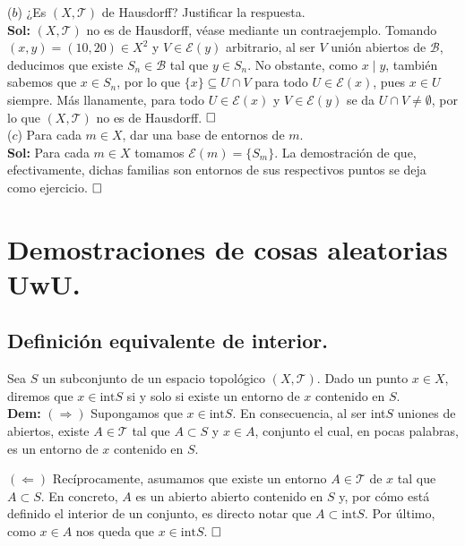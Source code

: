 \documentclass{article}
\begin{document}
\noindent($b$) ¿Es $(X, \mathcal{T})$ de Hausdorff? Justificar la respuesta. \\

\noindent\textbf{Sol:} $(X, \mathcal{T})$ no es de Hausdorff, véase mediante un contraejemplo. Tomando $(x, y) = (10, 20) \in X^2$ y $V \in \mathcal{E}(y)$ arbitrario, al ser $V$ unión abiertos de $\mathcal{B}$, deducimos que existe $S_n \in \mathcal{B}$ tal que $y \in S_n$. No obstante, como $x \mid y$, también sabemos que $x \in S_n$, por lo que $\{x\} \subseteq U \cap V$  para todo $U \in \mathcal{E}(x)$, pues $x \in U$ siempre. Más llanamente, para todo $U \in \mathcal{E}(x)$ y $V \in \mathcal{E}(y)$ se da $U \cap V \neq \emptyset$, por lo que $(X, \mathcal{T})$ no es de Hausdorff. $\hfill\square$ \\

\noindent($c$) Para cada $m \in X$, dar una base de entornos de $m$. \\

\noindent\textbf{Sol:} Para cada $m \in X$ tomamos $\mathcal{E}(m) = \{S_m\}$. La demostración de que, efectivamente, dichas familias son entornos de sus respectivos puntos se deja como ejercicio. $\hfill\square$

\newpage

\section{Demostraciones de cosas aleatorias UwU.}

\subsection{Definición equivalente de interior.}

Sea $S$ un subconjunto de un espacio topológico $(X, \mathcal{T})$. Dado un punto $x \in X$, diremos que $x \in \text{int}S$ si y solo si existe un entorno de $x$ contenido en $S$. \\

\noindent\textbf{Dem:} $(\Longrightarrow)$ Supongamos que $x \in \text{int}S$. En consecuencia, al ser int$S$ uniones de abiertos, existe $A \in \mathcal{T}$ tal que $A \subset S$ y $x \in A$, conjunto el cual, en pocas palabras, es un entorno de $x$ contenido en $S$.

\vspace{0.2cm}

\noindent$(\Longleftarrow)$ Recíprocamente, asumamos que existe un entorno $A \in \mathcal{T}$ de $x$ tal que $A \subset S$. En concreto, $A$ es un abierto abierto contenido en $S$ y, por cómo está definido el interior de un conjunto, es directo notar que $A \subset \text{int}S$. Por último, como $x \in A$ nos queda que $x \in \text{int}S$. $\hfill\square$
\end{document}
